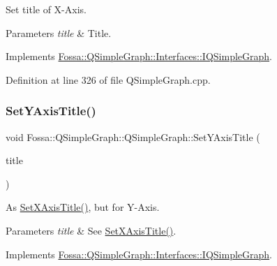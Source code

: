 Set title of X-\/\+Axis. 


\begin{DoxyParams}{Parameters}
{\em title} & Title. \\
\hline
\end{DoxyParams}


Implements \hyperlink{class_fossa_1_1_q_simple_graph_1_1_interfaces_1_1_i_q_simple_graph_adfca7d41a47790e8403507544468ba86}{Fossa\+::\+Q\+Simple\+Graph\+::\+Interfaces\+::\+I\+Q\+Simple\+Graph}.



Definition at line 326 of file Q\+Simple\+Graph.\+cpp.

\mbox{\label{class_fossa_1_1_q_simple_graph_1_1_q_simple_graph_a41c9e9d34744f6e6550ca97dc0d2f488}} 
\subsubsection{\texorpdfstring{Set\+Y\+Axis\+Title()}{SetYAxisTitle()}}
{\footnotesize\ttfamily void Fossa\+::\+Q\+Simple\+Graph\+::\+Q\+Simple\+Graph\+::\+Set\+Y\+Axis\+Title (\begin{DoxyParamCaption}\item[{Q\+String}]{title }\end{DoxyParamCaption})\hspace{0.3cm}{\ttfamily [virtual]}}



As \hyperlink{class_fossa_1_1_q_simple_graph_1_1_q_simple_graph_a7579da572b54d43ccec3d2bd572b6cfa}{Set\+X\+Axis\+Title()}, but for Y-\/\+Axis. 


\begin{DoxyParams}{Parameters}
{\em title} & See \hyperlink{class_fossa_1_1_q_simple_graph_1_1_q_simple_graph_a7579da572b54d43ccec3d2bd572b6cfa}{Set\+X\+Axis\+Title()}. \\
\hline
\end{DoxyParams}


Implements \hyperlink{class_fossa_1_1_q_simple_graph_1_1_interfaces_1_1_i_q_simple_graph_a606c07c40ed294cdd568de5488875af5}{Fossa\+::\+Q\+Simple\+Graph\+::\+Interfaces\+::\+I\+Q\+Simple\+Graph}.



